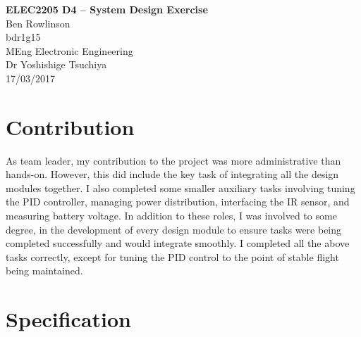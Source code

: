 \documentclass[a4paper,11pt]{article}
\begin{document}
  
\begin{center}
{\Large{\textbf{ELEC2205 D4 -- System Design Exercise}}} \\ [\baselineskip]
Ben Rowlinson\\
bdr1g15\\
MEng Electronic Engineering\\
Dr Yoshishige Tsuchiya\\
17/03/2017\\
\end{center}

\tableofcontents
\newpage
\listoffigures
\newpage
\mbox{}
\printnomenclature
\newpage

\section{Contribution}
As team leader, my contribution to the project was more administrative than hands-on. However, this did include the key task of integrating all the design modules together. I also completed some smaller auxiliary tasks involving tuning the PID controller, managing power distribution, interfacing the IR sensor, and measuring battery voltage. In addition to these roles, I was involved to some degree, in the development of every design module to ensure tasks were being completed successfully and would integrate smoothly. 
I completed all the above tasks correctly, except for tuning the PID control to the point of stable flight being maintained.
 
\section{Specification}
\end{document}
